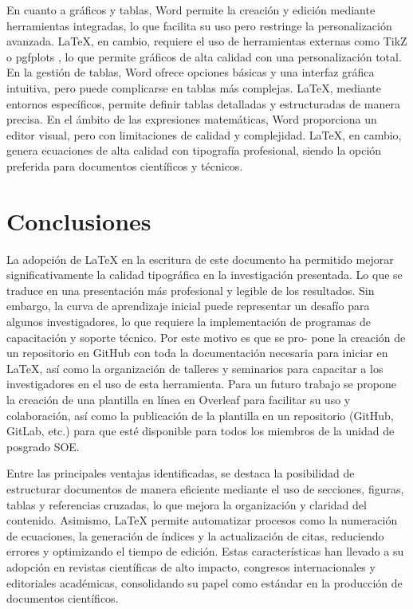 \documentclass[10pt,twocolumn]{article}
\begin{document}
En cuanto a gráficos y tablas, Word permite la creación y edición mediante herramientas integradas, lo que facilita su uso pero restringe la personalización avanzada. 
LaTeX, en cambio, requiere el uso de herramientas externas como TikZ o pgfplots , lo que permite gráficos de alta calidad con una personalización total. 
En la gestión de tablas, Word ofrece opciones básicas y una interfaz gráfica intuitiva, pero puede complicarse en tablas más complejas. LaTeX, mediante entornos específicos, permite definir tablas detalladas y estructuradas de manera precisa. 
En el ámbito de las expresiones matemáticas, Word proporciona un editor visual, pero con limitaciones de calidad y complejidad. LaTeX, en cambio, genera ecuaciones de alta calidad con tipografía profesional, siendo la opción preferida para documentos científicos y técnicos.
    
    \section{Conclusiones}
    La adopción de LaTeX en la escritura de este documento ha permitido mejorar significativamente la calidad tipográfica en la investigación presentada. 
    Lo que se traduce en una presentación más profesional y legible de los resultados. Sin embargo, la curva de aprendizaje inicial puede representar un desafío para algunos investigadores, lo que requiere la implementación de programas de capacitación y soporte técnico. 
    Por este motivo es que se pro- pone la creación de un repositorio en GitHub con toda la documentación necesaria para iniciar en LaTeX, así como la organización de talleres y seminarios para capacitar a los investigadores en el uso de esta herramienta. 
    Para un futuro trabajo se propone la creación de una plantilla en línea en Overleaf para facilitar su uso y colaboración, así como la publicación de la plantilla en un repositorio (GitHub, GitLab, etc.) para que esté disponible para todos los miembros de la unidad de posgrado SOE.

    Entre las principales ventajas identificadas, se destaca la posibilidad de estructurar documentos de manera eficiente mediante el uso de secciones, figuras, tablas y referencias cruzadas, lo que mejora la organización y claridad del contenido. 
    Asimismo, LaTeX permite automatizar procesos como la numeración de ecuaciones, la generación de índices y la actualización de citas, reduciendo errores y optimizando el tiempo de edición. 
    Estas características han llevado a su adopción en revistas científicas de alto impacto, congresos internacionales y editoriales académicas, consolidando su papel como estándar en la producción de documentos científicos.
\end{document}
